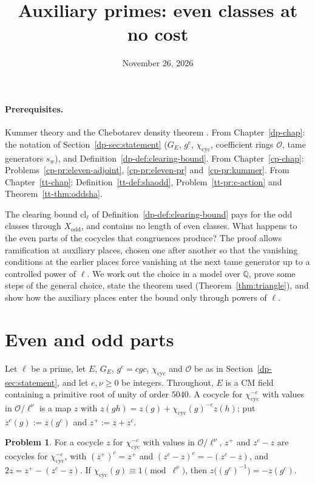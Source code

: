 \documentclass[reqno]{amsart}
\title{Auxiliary primes: even classes at no cost}
\author{}
\date{November 26, 2026}
\newcounter{chap}
\theoremstyle{definition}
\newtheorem{problem}{Problem}[section]
\theoremstyle{plain}
\newcommand{\Q}{\mathbb{Q}}
\newcommand{\Oc}{\mathcal{O}}
\newcommand{\cyc}{\chi_{\mathrm{cyc}}}
\begin{document}
\maketitle
{}\label{chap}

\paragraph{Prerequisites.}
Kummer theory and the Chebotarev density theorem \cite[IV \S3, VII \S13]{Ne}.  From Chapter~\ref{dp-chap}: the notation of Section~\ref{dp-sec:statement} (\(G_E\), \(g^c\), \(\cyc\), coefficient rings \(\Oc\), tame generators \(s_w\)), and Definition~\ref{dp-def:clearing-bound}.  From Chapter~\ref{cp-chap}: Problems~\ref{cp-pr:eleven-adjoint}, \ref{cp-pr:eleven-pr} and~\ref{cp-pr:kummer}.  From Chapter~\ref{tt-chap}: Definition~\ref{tt-def:shaodd}, Problem~\ref{tt-pr:c-action} and Theorem~\ref{tt-thm:oddsha}.

\medskip
The clearing bound \(\mathrm{cl}_\ell\) of Definition~\ref{dp-def:clearing-bound} pays for the odd classes through \(X_{\mathrm{odd}}\), and contains no length of even classes.  What happens to the even parts of the cocycles that congruences produce?  The proof allows ramification at auxiliary places, chosen one after another so that the vanishing conditions at the earlier places force vanishing at the next tame generator up to a controlled power of \(\ell\).  We work out the choice in a model over \(\Q\), prove some steps of the general choice, state the theorem used (Theorem~\ref{thm:triangle}), and show how the auxiliary places enter the bound only through powers of \(\ell\).

\section{Even and odd parts}\label{sec:parity}

Let \(\ell\) be a prime, let \(E\), \(G_E\), \(g^c = cgc\), \(\cyc\) and \(\Oc\) be as in Section~\ref{dp-sec:statement}, and let \(e, \nu \ge 0\) be integers.  Throughout, \(E\) is a CM field containing a primitive root of unity of order \(5040\).  A cocycle for \(\cyc^{-e}\) with values in \(\Oc/\ell^\nu\) is a map \(z\) with \(z(gh) = z(g) + \cyc(g)^{-e}z(h)\); put \(z^c(g) := z(g^c)\) and \(z^+ := z + z^c\).

\begin{problem}\label{pr:even-odd}
For a cocycle \(z\) for \(\cyc^{-e}\) with values in \(\Oc/\ell^\nu\), \(z^+\) and \(z^c - z\) are cocycles for \(\cyc^{-e}\), with \((z^+)^c = z^+\) and \((z^c - z)^c = -(z^c - z)\), and \(2z = z^+ - (z^c - z)\).  If \(\cyc(g) \equiv 1 \pmod{\ell^\nu}\), then \(z\bigl((g^c)^{-1}\bigr) = -z(g^c)\).
\end{problem}
\end{document}

